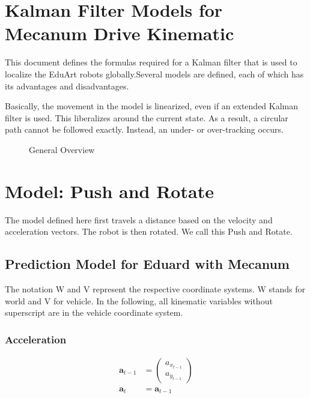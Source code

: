 \documentclass{article}
\begin{document}
\section{Kalman Filter Models for Mecanum Drive Kinematic}

This document defines the formulas required for a Kalman filter that is used to localize the EduArt robots globally.Several models are defined, each of which has its advantages and disadvantages. 

Basically, the movement in the model is linearized, even if an extended Kalman filter is used. This liberalizes around the current state. As a result, a circular path cannot be followed exactly. Instead, an under- or over-tracking occurs.

\begin{figure}
  \center
  
  \caption{General Overview}
  \label{fig:general_overview}
\end{figure}

\clearpage
\section{Model: Push and Rotate}


The model defined here first travels a distance based on the velocity and acceleration vectors. The robot is then rotated. We call this Push and Rotate.

\subsection{Prediction Model for Eduard with Mecanum}

The notation W and V represent the respective coordinate systems. W stands for world and V for vehicle. In the following, all kinematic variables without superscript are in the vehicle coordinate system.

\subsubsection{Acceleration}
\begin{align}
  \textbf{a}_{t-1} &= \left(\begin{matrix}a_{x_{t-1}}\\a_{y_{t-1}}\end{matrix}\right) \\
  \textbf{a}_t &= \textbf{a}_{t-1}
\end{align}
\end{document}
